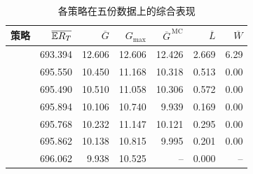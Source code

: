 \begin{table}[htbp]
\centering\small
\caption{各策略在五份数据上的综合表现}\label{tab:aggregate}
\begin{tabular}{lrrrrrr}
\toprule
策略 & $\overline{\mathbb E R_T}$ & $\overline G$ & $G_{\max}$ & $\overline G^{\,\mathrm{MC}}$ & $\overline{L}$ & $\overline W$ \\
\midrule
\AlgOne{} & 693.394 & 12.606 & 12.606 & 12.426 & 2.669 & 6.29 \\
\Greedy{} & 695.550 & 10.450 & 11.168 & 10.318 & 0.513 & 0.00 \\
\LPFD{} & 695.490 & 10.510 & 11.058 & 10.306 & 0.572 & 0.00 \\
\LPDual{} & 695.894 & 10.106 & 10.740 & 9.939 & 0.169 & 0.00 \\
\LPCount{} & 695.768 & 10.232 & 11.147 & 10.121 & 0.295 & 0.00 \\
\IIDDP{} & 695.862 & 10.138 & 10.815 & 9.995 & 0.201 & 0.00 \\
\SeqDP{} & 696.062 & 9.938 & 10.525 & -- & 0.000 & -- \\
\bottomrule
\end{tabular}
\par{}
\end{table}
